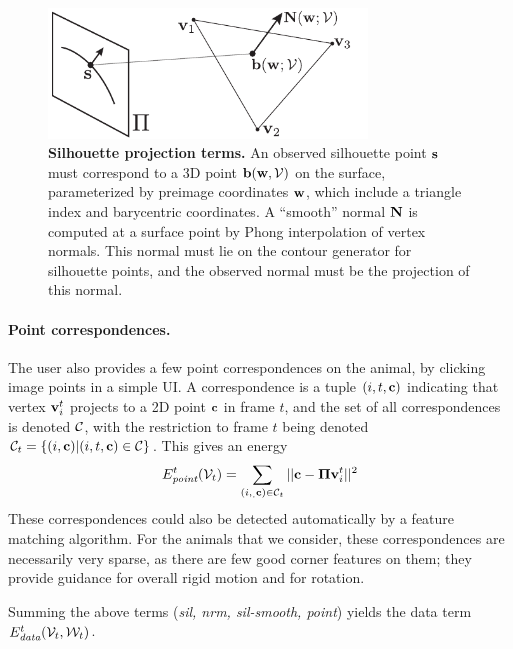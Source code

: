 \documentclass[preprint]{acmsiggraph}
\begin{document}
\begin{figure}
\includegraphics[width=3.33in]{projection2.pdf}
\caption{\label{fig:projection}  
\textbf{Silhouette projection terms.}
An observed silhouette point $\mathbf{s}$ must correspond to a 3D point $\mathbf{b}(\mathbf{w}, \mathcal{V})$ on the surface, parameterized by preimage coordinates $\mathbf{w}$, which include a triangle index and barycentric coordinates.  A ``smooth'' normal $\mathbf{N}$ is computed at a surface point by Phong interpolation of vertex normals. This normal must lie on the contour generator for silhouette points, and the observed normal must be the projection of this normal.
}
\end{figure}


\paragraph{Point correspondences.}
The user also provides a few point correspondences on the animal, by
clicking image points in a simple UI.  A correspondence is a tuple $(i,t,\mathbf{c})$ indicating that vertex $\mathbf{v}^t_i$ projects to a 2D point
$\mathbf{c}$ in frame $t$, and the set of all correspondences is denoted $\mathcal{C}$, with the restriction to frame $t$ being denoted $\mathcal{C}_t = \{(i,\mathbf{c})|(i,t,\mathbf{c})\in\mathcal{C}\}$.
This gives an energy
\begin{equation}
E_{\text{\em point}}^t(\mathcal{V}_t) = \sum_{(i,_,\mathbf{c})\in\mathcal{C}_t} || \mathbf{c} - \mbox{\boldmath$\Pi$} \mathbf{v}_i^t ||^2
\label{eq:Epoint}
\end{equation}
These correspondences could also be detected automatically by a
feature matching algorithm. For the animals that we consider, these
correspondences are necessarily very sparse, as there are few good
corner features on them; they provide guidance for overall rigid
motion and for rotation. 

Summing the above terms ({\em sil, nrm, sil-smooth, point}) yields the data term $E_{\text{\em data}}^t(\mathcal{V}_t, \mathcal{W}_t)$.
\end{document}
